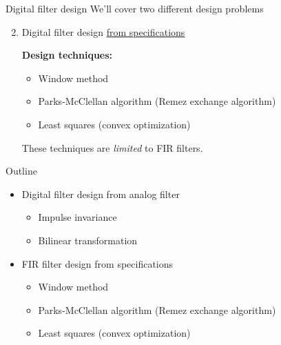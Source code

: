\documentclass[10pt, handout]{beamer}
\begin{document}
%
\begin{frame}{Digital filter design}
We'll cover two different design problems
\begin{enumerate}\setcounter{enumi}{1}
	\item Digital filter design \underline{from specifications}
	
	\begin{center}
		\resizebox{0.6\linewidth}{!}{}
	\end{center}
	
	\textbf{Design techniques:}
	\begin{itemize}
		\item Window method
		\item Parks-McClellan algorithm (Remez exchange algorithm)
		\item Least squares (convex optimization)	
	\end{itemize}
	These techniques are \textit{limited} to FIR filters.
\end{enumerate}
\end{frame}

\begin{frame}{Outline}
\begin{itemize}
	\item Digital filter design from analog filter
	\begin{itemize}
		\item Impulse invariance
		\item Bilinear transformation
	\end{itemize}
	\item FIR filter design from specifications
	\begin{itemize}
		\item Window method
		\item Parks-McClellan algorithm (Remez exchange algorithm)
		\item Least squares (convex optimization)	
	\end{itemize}
\end{itemize}	
\end{frame}
\end{document}
